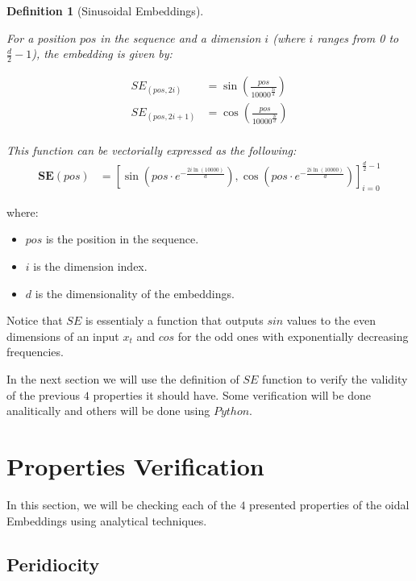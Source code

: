 \documentclass{article}
\newtheorem{definition}{Definition}[section]
\begin{document}
\begin{definition}[Sinusoidal Embeddings]
	\label{def:sin_embedding}
	
	For a position \( pos \) in the sequence and a dimension \( i \) (where \( i \) ranges from 0 to \( \frac{d}{2}-1 \)), the embedding is given by:
	
	\begin{align}
		SE_{(pos, 2i)} &= \sin\left(\frac{pos}{10000^{\frac{2i}{d}}}\right) \\
		SE_{(pos, 2i+1)} &= \cos\left(\frac{pos}{10000^{\frac{2i}{d}}}\right) \\
	\end{align}
	
	This function can be vectorially expressed as the following: 
	\begin{align}
		\mathbf{SE}(pos) &= \left[ \sin\left(pos \cdot e^{- \frac{2i \ln(10000)}{d}}\right), \cos\left(pos \cdot e^{- \frac{2i \ln(10000)}{d}}\right) \right]_{i=0}^{\frac{d}{2}-1}
	\end{align}
	

\end{definition}

where:

\begin{itemize}
	\item \( pos \) is the position in the sequence.
	\item  \( i \) is the dimension index.
	\item  \( d \) is the dimensionality of the embeddings.
\end{itemize}


Notice that $SE$ is essentialy a function that outputs $sin$ values to the even dimensions of an input $x_t$ and $cos$ for the odd ones with exponentially decreasing frequencies.


In the next section we will use the definition of  $SE$ function to verify the validity of the previous $4$ properties it should have. Some verification will be done analitically and others will be done using $Python$.

\section{Properties Verification}

In this section, we will be checking each of the $4$ presented properties of the oidal Embeddings using analytical techniques.


\subsection{Peridiocity}
\end{document}
